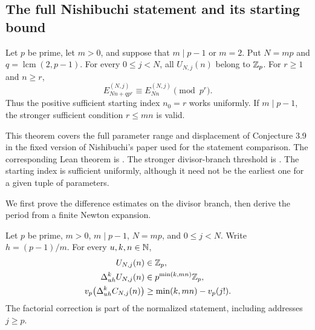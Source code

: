 \subsection{The full Nishibuchi statement and its starting bound}

\begin{theorem}\label{thm:arith-nishibuchi}
Let $p$ be prime, let $m>0$, and suppose that $m\mid p-1$ or $m=2$.
Put $N=mp$ and $q=\operatorname{lcm}(2,p-1)$.  For every $0\le j<N$,
all $U_{N,j}(n)$ belong to $\mathbb Z_p$.  For $r\ge1$ and $n\ge r$,
\begin{equation}\label{eq:arith-nishibuchi}
 E_{Nn+qp^r}^{(N,j)}\equiv E_{Nn}^{(N,j)}\pmod{p^r}.
\end{equation}
Thus the positive sufficient starting index $n_0=r$ works uniformly.
If $m\mid p-1$, the stronger sufficient condition $r\le mn$ is valid.
\end{theorem}

This theorem covers the full parameter range and displacement of Conjecture
3.9 in the fixed version of Nishibuchi's paper used for the statement
comparison.  The corresponding Lean theorem is
.
The stronger divisor-branch threshold is
.
The starting index is sufficient uniformly, although it need not be the
earliest one for a given tuple of parameters.

We first prove the difference estimates on the divisor branch, then derive
the period from a finite Newton expansion.

\begin{theorem}
\label{thm:arith-divisor-base}
Let $p$ be prime, $m>0$, $m\mid p-1$, $N=mp$, and $0\le j<N$.
Write $h=(p-1)/m$.  For every $u,k,n\in\mathbb N$,
\begin{align}
 U_{N,j}(n)&\in\mathbb Z_p,\label{eq:arith-divisor-integral}\\
 \Delta_{uh}^{k}U_{N,j}(n)&\in p^{\min(k,mn)}\mathbb Z_p,\label{eq:arith-divisor-bound}\\
 v_p\bigl(\Delta_{uh}^{k}C_{N,j}(n)\bigr)
   &\ge\min(k,mn)-v_p(j!).\label{eq:arith-divisor-normalized}
\end{align}
The factorial correction is part of the normalized statement, including
addresses $j\ge p$.
\end{theorem}

